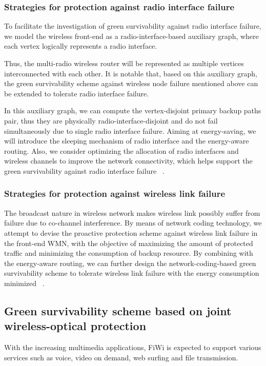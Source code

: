 \documentclass[conference,compsoc]{IEEEtran}
\begin{document}
\subsubsection{Strategies for protection against radio interface failure}

To facilitate the investigation of green survivability against radio interface failure, we model the 
wireless front-end as a radio-interface-based auxiliary graph, where each vertex logically
represents a radio interface. 


Thus, the multi-radio wireless router will be represented as multiple vertices interconnected with 
each other. It is notable that, based on this auxiliary graph, the green
survivability scheme against wireless node failure mentioned above can be extended to tolerate radio 
interface failure. 

In this auxiliary graph, we can compute the vertex-disjoint primary backup paths 
pair, thus they are  physically radio-interface-disjoint and do not fail simultaneously due to 
single radio interface  failure. Aiming at energy-saving, we will introduce the sleeping
mechanism of radio interface and the energy-aware routing. Also, we consider optimizing the 
allocation of radio interfaces and wireless channels to improve the network connectivity, which
helps support the green survivability against radio interface failure ~\cite{Liu201268}.

\subsubsection{ Strategies for protection against wireless link failure}
The broadcast nature in wireless network makes wireless link possibly suffer from failure due to 
co-channel interference. By means of network coding technology, we attempt to devise the proactive 
protection scheme against wireless link failure in the front-end WMN, with the objective of 
maximizing the amount of protected traffic and minimizing the consumption  of backup resource. By 
combining with the energy-aware routing, we can further design the network-coding-based green 
survivability scheme to tolerate wireless link failure with the energy consumption minimized 
~\cite{Liu201268}.

\subsection{Green survivability scheme based on joint wireless-optical protection}
With the increasing multimedia applications, FiWi is expected to support various services such as 
voice, video on demand, web surfing and file transmission.
\end{document}
